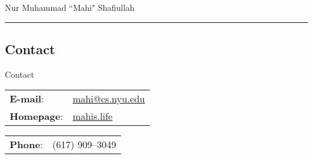 \documentclass[a4paper,10pt,oneside]{article}
\begin{document}

{\huge{Nur Muhammad ``Mahi" Shafiullah}}

\vspace{0.1in}
\hrule

\begin{body}
\section{Contact}
{Contact}
\begin{minipage}{0.49\linewidth}
{\begin{tabular}{ll}
\textbf{E-mail}: & \href{mailto:mahi@cs.nyu.edu}
{{mahi@cs.nyu.edu}}\\
\textbf{Homepage}: & \href{http://mahis.life}
{{mahis.life}}\\
\end{tabular}}
\end{minipage}
\begin{minipage}{0.5\linewidth}
\begin{tabular}{ll}
\textbf{Phone}: & (617)\,\,909--3049\\
\end{tabular}
\end{minipage}











% 




% 

% 

\end{body}
\end{document}
